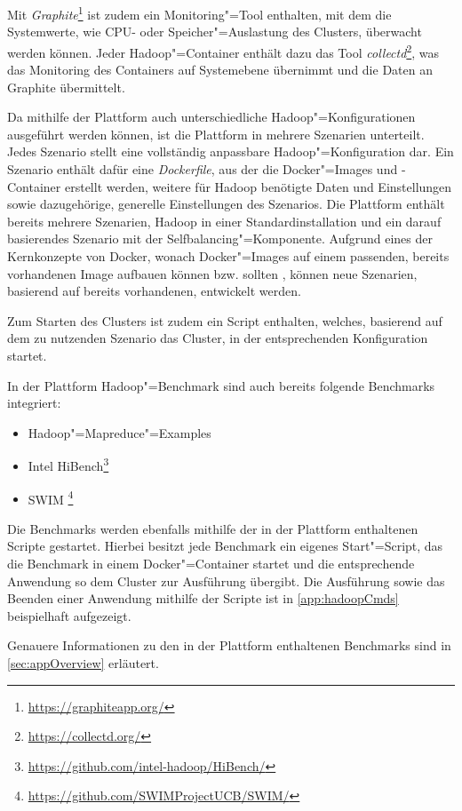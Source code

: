 Mit \emph{Graphite}\footnote{\url{https://graphiteapp.org/}} ist zudem ein Monitoring"=Tool enthalten, mit dem die Systemwerte, wie CPU- oder Speicher"=Auslastung des Clusters, überwacht werden können.
Jeder Hadoop"=Container enthält dazu das Tool \emph{collectd}\footnote{\url{https://collectd.org/}}, was das Monitoring des Containers auf Systemebene übernimmt und die Daten an Graphite übermittelt.

Da mithilfe der Plattform auch unterschiedliche Hadoop"=Konfigurationen ausgeführt werden können, ist die Plattform in mehrere Szenarien unterteilt.
Jedes Szenario stellt eine vollständig anpassbare Hadoop"=Konfiguration dar.
Ein Szenario enthält dafür eine \emph{Dockerfile}, aus der die Docker"=Images und -Container erstellt werden, weitere für Hadoop benötigte Daten und Einstellungen sowie dazugehörige, generelle Einstellungen des Szenarios.
Die Plattform enthält bereits mehrere Szenarien, \uA Hadoop in einer Standardinstallation und ein darauf basierendes Szenario mit der Selfbalancing"=Komponente.
Aufgrund eines der Kernkonzepte von Docker, wonach Docker"=Images auf einem passenden, bereits vorhandenen Image aufbauen können bzw. sollten \cite{DockerdevBestPractice}, können neue Szenarien, basierend auf bereits vorhandenen, entwickelt werden.

Zum Starten des Clusters ist zudem ein Script enthalten, welches, basierend auf dem zu nutzenden Szenario das Cluster, in der entsprechenden Konfiguration startet.

In der Plattform Hadoop"=Benchmark sind auch bereits folgende Benchmarks integriert:

\begin{itemize}
    \item Hadoop"=Mapreduce"=Examples
    \item Intel HiBench\footnote{\url{https://github.com/intel-hadoop/HiBench/}}
    \item \gls{SWIM} \footnote{\url{https://github.com/SWIMProjectUCB/SWIM/}}
\end{itemize}

Die Benchmarks werden ebenfalls mithilfe der in der Plattform enthaltenen Scripte gestartet.
Hierbei besitzt jede Benchmark ein eigenes Start"=Script, das die Benchmark in einem Docker"=Container startet und die entsprechende Anwendung so dem Cluster zur Ausführung übergibt.
Die Ausführung sowie das Beenden einer Anwendung mithilfe der Scripte ist in \cref{app:hadoopCmds} beispielhaft aufgezeigt.

Genauere Informationen zu den in der Plattform enthaltenen Benchmarks sind in \cref{sec:appOverview} erläutert.
